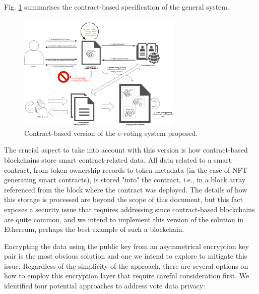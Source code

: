 \documentclass[./4_GeneralApproach.tex]{subfiles}
\begin{document}
Fig. \ref{fig:contract_based_architecture} summarises the contract-based specification of the general system.

\begin{figure}[htp]
    \centering
    \includegraphics[width=0.7\textwidth]{../Images/02_contract_based_solution.png}
    \caption{Contract-based version of the e-voting system proposed.}
    \label{fig:contract_based_architecture}
\end{figure}

The crucial aspect to take into account with this version is how contract-based blockchains store smart contract-related data. All data related to a smart contract, from token ownership records to token metadata (in the case of NFT-generating smart contracts), is stored "into" the contract, i.e., in a block array referenced from the block where the contract was deployed. The details of how this storage is processed are beyond the scope of this document, but this fact exposes a security issue that requires addressing since contract-based blockchains are quite common, and we intend to implement this version of the solution in Ethereum, perhaps the best example of such a blockchain.
\par
Encrypting the data using the public key from an asymmetrical encryption key pair is the most obvious solution and one we intend to explore to mitigate this issue. Regardless of the simplicity of the approach, there are several options on how to employ this encryption layer that require careful consideration first. We identified four potential approaches to address vote data privacy:
\end{document}
